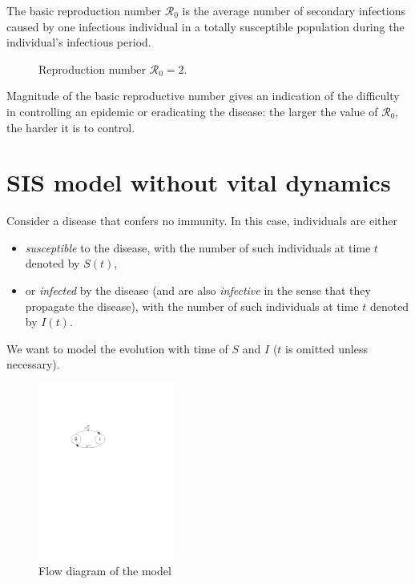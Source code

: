 \begin{definition}
The basic reproduction number $\mathcal{R}_0$ is the average number of secondary infections caused by one infectious individual in a totally susceptible population during the individual's infectious period.
\end{definition}
\begin{figure}[h]
\caption{Reproduction number $\mathcal{R}_0=2$.}
\end{figure}
Magnitude of the basic reproductive number gives an indication of the difficulty in controlling an epidemic or eradicating the disease: the larger the value of $\mathcal{R}_0$, the harder it is to control.



\section{SIS model without vital dynamics}
Consider a disease that confers no immunity. In this case,
individuals are either
\begin{itemize}
\item \emph{susceptible} to the disease, with the number of such individuals at time $t$ denoted by $S(t)$,
\item or \emph{infected} by the disease (and are also \emph{infective} in the sense that they propagate the disease), with the number of such individuals at time $t$ denoted by $I(t)$.
\end{itemize}
\vskip1cm
We want to model the evolution with time of $S$ and $I$ ($t$ is omitted unless necessary).



\begin{figure}[htbp]
\begin{center}    
\includegraphics[width=0.4\textwidth]
{../figs_04_epidemic_models/SIS_nodemography}
\caption{Flow diagram of the model}
\end{center}
\end{figure}

